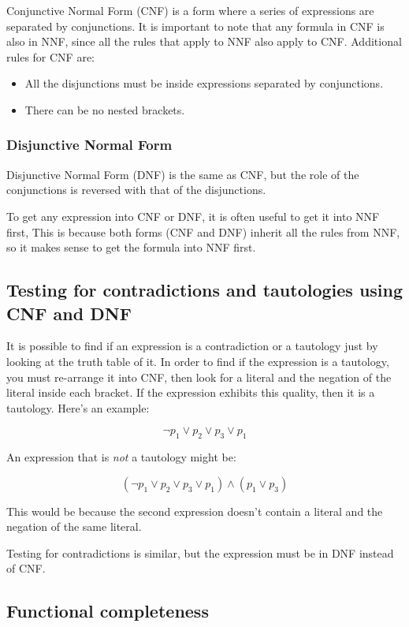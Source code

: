 Conjunctive Normal Form (CNF) is a form where a series of expressions are
separated by conjunctions. It is important to note that any formula in CNF is
also in NNF, since all the rules that apply to NNF also apply to CNF. Additional
rules for CNF are:

\begin{itemize}
	\item All the disjunctions must be inside expressions separated by
	conjunctions.
	\item There can be no nested brackets.
\end{itemize}

\subsubsection{Disjunctive Normal Form}

Disjunctive Normal Form (DNF) is the same as CNF, but the role of the
conjunctions is reversed with that of the disjunctions.

To get any expression into CNF or DNF, it is often useful to get it into NNF
first, This is because both forms (CNF and DNF) inherit all the rules from NNF,
so it makes sense to get the formula into NNF first.

\subsection{Testing for contradictions and tautologies using CNF and DNF}

It is possible to find if an expression is a contradiction or a tautology just
by looking at the truth table of it. In order to find if the expression is a
tautology, you must re-arrange it into CNF, then look for a literal and the
negation of the literal inside each bracket. If the expression exhibits this
quality, then it is a tautology. Here's an example:

\[
	\neg p_1 \vee p_2 \vee p_3 \vee p_1
\]

An expression that is {\it not} a tautology might be:

\[
	(\neg p_1 \vee p_2 \vee p_3 \vee p_1) \wedge (p_1 \vee p_3)
\]

This would be because the second expression doesn't contain a literal and the
negation of the same literal.

Testing for contradictions is similar, but the expression must be in DNF instead
of CNF.

\subsection{Functional completeness}

